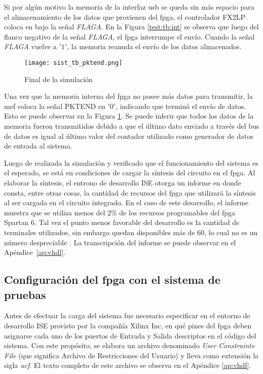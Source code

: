 	Si por algún motivo la memoria de la interfaz \acrshort{usb} se queda sin más espacio para el almacenamiento de los datos que provienen del \acrshort{fpga}, el controlador FX2LP coloca en bajo la señal \textit{FLAGA}. En la Figura \ref{test:tb:int} se observa que luego del flanco negativo de la señal \textit{FLAGA}, el \acrshort{fpga} interrumpe el envío. Cuando la señal \textit{FLAGA} vuelve a $'1'$, la memoria reanuda el envío de los datos almacenados.
	
	\begin{figure}[b]
		\centering
		\texttt{[image: sist\_tb\_pktend.png]}
		\caption{Final de la simulación}
		\label{test:tb:pktend}
	\end{figure}

	Una vez que la memoria interna del \acrshort{fpga} no posee más datos para transmitir, la \acrshort{mef} coloca la señal PKTEND en $'0'$, indicando que terminó el envío de datos. Esto se puede observar en la Figura \ref{test:tb:pktend}. Se puede inferir que todos los datos de la memoria fueron transmitidos debido a que el último dato enviado a través del bus de datos es igual al último valor del contador utilizado como generador de datos de entrada al sistema. 
	
	Luego de realizada la simulación y verificado que el funcionamiento del sistema es el esperado, se está en condiciones de cargar la síntesis del circuito en el \acrshort{fpga}. Al elaborar la síntesis, el entrono de desarrollo ISE otorga un informe en donde consta, entre otras cosas, la cantidad de recursos del \acrshort{fpga} que utilizará la síntesis al ser cargada en el circuito integrado. En el caso de este desarrollo, el informe muestra que se utiliza menos del 2\% de los recursos programables del \acrshort{fpga} Spartan 6. Tal vez el punto menos favorable del desarrollo es la cantidad de terminales utilizados, sin embargo quedan disponibles más de 60, lo cual no es un número despreciable . La transcripción del informe se puede observar en el Apéndice~\ref{ap:vhdl}. 
		
\subsection{Configuración del \acrshort{fpga} con el sistema de pruebas}
	Antes de efectuar la carga del sistema fue necesario especificar en el entorno de desarrollo ISE provisto por la compañía Xilinx Inc, en qué pines del \acrshort{fpga} deben asignarse cada uno de los puertos de Entrada y Salida descriptos en el código del sistema. Con este propósito, se elabora un archivo denominado \textit{User Constraints File} (que significa Archivo de Restricciones del Usuario) y lleva como extensión la sigla \textit{ucf}. El texto completo de este archivo se observa en el Apéndice \ref{ap:vhdl}.
	
